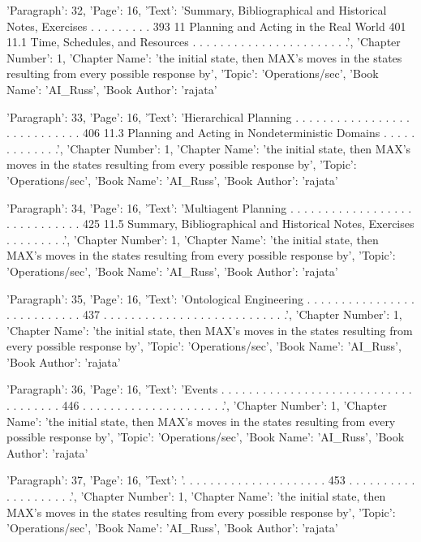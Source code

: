 {'Paragraph': 32, 'Page': 16, 'Text': 'Summary, Bibliographical and Historical Notes, Exercises . . . . . . . . . 393 11 Planning and Acting in the Real World 401 11.1 Time, Schedules, and Resources . . . . . . . . . . . . . . . . . . . . . . .', 'Chapter Number': 1, 'Chapter Name': 'the initial state, then MAX’s moves in the states resulting from every possible response by', 'Topic': 'Operations/sec', 'Book Name': 'AI_Russ', 'Book Author': 'rajata'}

{'Paragraph': 33, 'Page': 16, 'Text': 'Hierarchical Planning . . . . . . . . . . . . . . . . . . . . . . . . . . . . 406 11.3 Planning and Acting in Nondeterministic Domains . . . . . . . . . . . . .', 'Chapter Number': 1, 'Chapter Name': 'the initial state, then MAX’s moves in the states resulting from every possible response by', 'Topic': 'Operations/sec', 'Book Name': 'AI_Russ', 'Book Author': 'rajata'}

{'Paragraph': 34, 'Page': 16, 'Text': 'Multiagent Planning . . . . . . . . . . . . . . . . . . . . . . . . . . . . . 425 11.5 Summary, Bibliographical and Historical Notes, Exercises . . . . . . . . .', 'Chapter Number': 1, 'Chapter Name': 'the initial state, then MAX’s moves in the states resulting from every possible response by', 'Topic': 'Operations/sec', 'Book Name': 'AI_Russ', 'Book Author': 'rajata'}

{'Paragraph': 35, 'Page': 16, 'Text': 'Ontological Engineering . . . . . . . . . . . . . . . . . . . . . . . . . . . 437 . . . . . . . . . . . . . . . . . . . . . . . . . . .', 'Chapter Number': 1, 'Chapter Name': 'the initial state, then MAX’s moves in the states resulting from every possible response by', 'Topic': 'Operations/sec', 'Book Name': 'AI_Russ', 'Book Author': 'rajata'}

{'Paragraph': 36, 'Page': 16, 'Text': 'Events . . . . . . . . . . . . . . . . . . . . . . . . . . . . . . . . . . . . 446 . . . . . . . . . . . . . . . . . . . . .', 'Chapter Number': 1, 'Chapter Name': 'the initial state, then MAX’s moves in the states resulting from every possible response by', 'Topic': 'Operations/sec', 'Book Name': 'AI_Russ', 'Book Author': 'rajata'}

{'Paragraph': 37, 'Page': 16, 'Text': '. . . . . . . . . . . . . . . . . . . . . 453 . . . . . . . . . . . . . . . . . . . .', 'Chapter Number': 1, 'Chapter Name': 'the initial state, then MAX’s moves in the states resulting from every possible response by', 'Topic': 'Operations/sec', 'Book Name': 'AI_Russ', 'Book Author': 'rajata'}

